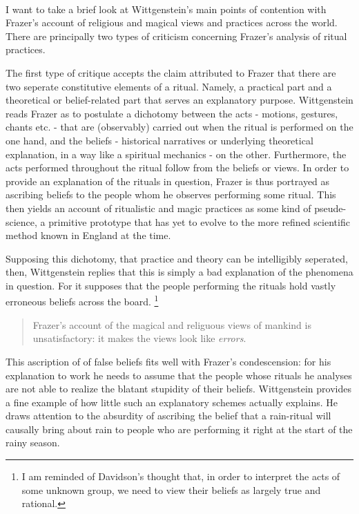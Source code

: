 \documentclass{article}
\begin{document}
\paragraph{ }
I want to take a brief look at Wittgenstein's main points of contention with Frazer's account of religious and magical views and practices across the world. There are principally two types of criticism concerning Frazer's analysis of ritual practices. 

The first type of critique accepts the claim attributed to Frazer that there are two seperate constitutive elements of a ritual. Namely, a practical part and a theoretical or belief-related part that serves an explanatory purpose. Wittgenstein reads Frazer as to postulate a dichotomy between the acts - motions, gestures, chants etc. - that are (observably) carried out when the ritual is performed on the one hand, and the beliefs - historical narratives or underlying theoretical explanation, in a way like a spiritual mechanics - on the other. Furthermore, the acts performed throughout the ritual follow from the beliefs or views. In order to provide an explanation of the rituals in question, Frazer is thus portrayed as ascribing beliefs to the people whom he observes performing some ritual. This then yields an account of ritualistic and magic practices as some kind of pseude-science, a primitive prototype that has yet to evolve to the more refined scientific method known in England at the time. 

Supposing this dichotomy, that practice and theory can be intelligibly seperated, then, Wittgenstein replies that this is simply a bad explanation of the phenomena in question. For it supposes that the people performing the rituals hold vastly erroneous beliefs across the board. \footnote{I am reminded of Davidson's thought that, in order to interpret the acts of some unknown group, we need to view their beliefs as largely true and rational.}
\begin{quote}
Frazer's account of the magical and religuous views of mankind is unsatisfactory: it makes the views look like \textit{errors}.
\end{quote} %
This ascription of of false beliefs fits well with Frazer's condescension: for his explanation to work he needs to assume that the people whose rituals he analyses are not able to realize the blatant stupidity of their beliefs. Wittgenstein provides a fine example of how little such an explanatory schemes actually explains. He draws attention to the absurdity of ascribing the belief that a rain-ritual will causally bring about rain to people who are performing it right at the start of the rainy season.
\end{document}
